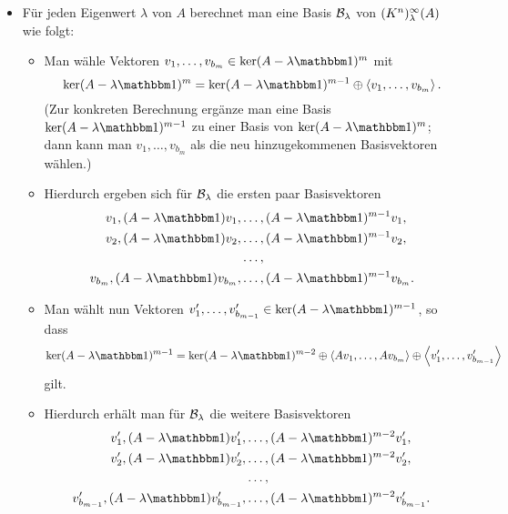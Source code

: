 \begin{itemize}[resume]
  \item
    Für jeden Eigenwert $\lambda$ von $A$ berechnet man eine Basis $\mathcal{B}_\lambda$ von $(K^n)_{\lambda}^{\infty}(A)$ wie folgt:
    \begin{itemize}
      \item
        Man wähle Vektoren $v_1, \dotsc, v_{b_m} \in \ker (A - \lambda \Id)^m$ mit
        \[
                    \ker (A - \lambda \Id)^m
          =         \ker (A - \lambda \Id)^{m-1}
            \oplus  \generated{v_1, \dotsc, v_{b_m}}.
        \]
        (Zur konkreten Berechnung ergänze man eine Basis $\ker (A - \lambda \Id)^{m-1}$ zu einer Basis von $\ker (A - \lambda \Id)^m$; dann kann man $v_1, \dotsc, v_{b_m}$ als die neu hinzugekommenen Basisvektoren wählen.)
      \item
        Hierdurch ergeben sich für $\mathcal{B}_\lambda$ die ersten paar Basisvektoren
        \begin{align*}
          v_1,     (A - \lambda \Id) v_1,     &\dotsc, (A - \lambda \Id)^{m-1} v_1,     \\
          v_2,     (A - \lambda \Id) v_2,     &\dotsc, (A - \lambda \Id)^{m-1} v_2,     \\
                              &\dotsc,                  \\
          v_{b_m}, (A - \lambda \Id) v_{b_m}, &\dotsc, (A - \lambda \Id)^{m-1} v_{b_m}.
        \end{align*}
      \item
        Man wählt nun Vektoren $v'_1, \dotsc, v'_{b_{m-1}} \in \ker (A - \lambda \Id)^{m-1}$, so dass
        \[
                    \ker (A - \lambda \Id)^{m-1}
          =         \ker (A - \lambda \Id)^{m-2}
            \oplus  \generated{ A v_1, \dotsc, A v_{b_m} }
            \oplus  \generated{ v'_1, \dotsc, v'_{b_{m-1}} }
        \]
        gilt.
      \item
        Hierdurch erhält man für $\mathcal{B}_\lambda$ die weitere Basisvektoren
        \begin{align*}
          v'_1,         (A - \lambda \Id) v'_1,         &\dotsc, (A - \lambda \Id)^{m-2} v'_1,          \\
          v'_2,         (A - \lambda \Id) v'_2,         &\dotsc, (A - \lambda \Id)^{m-2} v'_2,          \\
                                        &\dotsc,                        \\
          v'_{b_{m-1}}, (A - \lambda \Id) v'_{b_{m-1}}, &\dotsc, (A - \lambda \Id)^{m-2} v'_{b_{m-1}}.

\end{align*}
\end{itemize}
\end{itemize}
